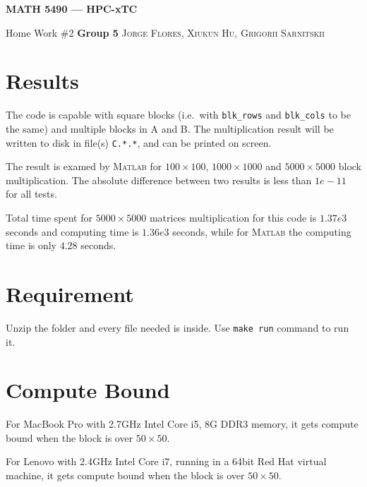 \documentclass[12pt]{article}
\newcommand{\0}{\mathbf{0}}
\begin{document}

\setlength{\parskip}{0.125in}




\centerline{\bf \Large MATH 5490 --- HPC-xTC}

\bigskip
\centerline{\large Home Work \#2 \qquad \textbf{Group 5} \textsc{Jorge Flores, Xiukun Hu, Grigorii Sarnitskii }}

\section{Results}

The code is capable with square blocks (i.e.~with \texttt{blk\_rows} and \texttt{blk\_cols} to be the same) and multiple blocks in A and B.
The multiplication result will be written to disk in file(s) \texttt{C.*.*}, and can be printed on screen.

The result is examed by \textsc{Matlab} for $100\times100$, $1000\times1000$ and $5000\times5000$ block multiplication. The absolute difference between two results is less than $1e-11$ for all tests.

Total time spent for $5000\times5000$ matrices multiplication for this code is $1.37e3$ seconds and computing time is $1.36e3$ seconds, while for \textsc{Matlab} the computing time is only $4.28$ seconds.


\section{Requirement}

Unzip the folder and every file needed is inside. Use \texttt{make run} command to run it.

\section{Compute Bound}

For MacBook Pro with 2.7GHz Intel Core i5, 8G DDR3 memory, it gets compute bound when the block is over $50\times 50$.

For Lenovo with 2.4GHz Intel Core i7, running in a 64bit Red Hat virtual machine, it gets compute bound when the block is over $50\times 50$.
\end{document}
